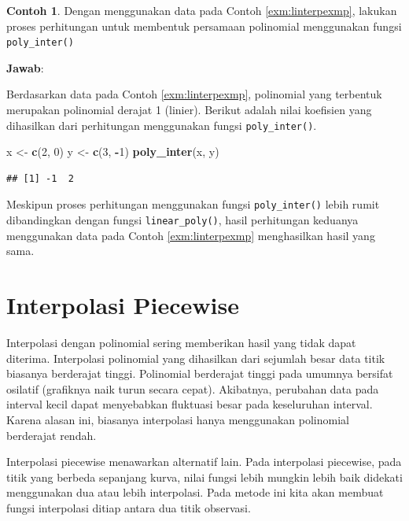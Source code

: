 \documentclass[
]{book}
\newenvironment{Shaded}{\begin{snugshade}}{\end{snugshade}}
\newcommand{\DecValTok}[1]{\textcolor[rgb]{0.00,0.00,0.81}{#1}}
\newcommand{\FunctionTok}[1]{\textcolor[rgb]{0.13,0.29,0.53}{\textbf{#1}}}
\newcommand{\NormalTok}[1]{#1}
\newcommand{\OtherTok}[1]{\textcolor[rgb]{0.56,0.35,0.01}{#1}}
\newcommand{\SpecialCharTok}[1]{\textcolor[rgb]{0.81,0.36,0.00}{\textbf{#1}}}
\theoremstyle{definition}
\theoremstyle{definition}
\newtheorem{example}{Contoh}[chapter]
\theoremstyle{definition}
\theoremstyle{definition}
\theoremstyle{remark}
\begin{document}
\begin{example}
\protect\hypertarget{exm:hopoliexmp2}{}\label{exm:hopoliexmp2}Dengan menggunakan data pada Contoh \ref{exm:linterpexmp}, lakukan proses perhitungan untuk membentuk persamaan polinomial menggunakan fungsi \texttt{poly\_inter()}
\end{example}

\textbf{Jawab}:

Berdasarkan data pada Contoh \ref{exm:linterpexmp}, polinomial yang terbentuk merupakan polinomial derajat 1 (linier). Berikut adalah nilai koefisien yang dihasilkan dari perhitungan menggunakan fungsi \texttt{poly\_inter()}.

\begin{Shaded}
\begin{Highlighting}[]
\NormalTok{x }\OtherTok{\textless{}{-}} \FunctionTok{c}\NormalTok{(}\DecValTok{2}\NormalTok{, }\DecValTok{0}\NormalTok{)}
\NormalTok{y }\OtherTok{\textless{}{-}} \FunctionTok{c}\NormalTok{(}\DecValTok{3}\NormalTok{, }\SpecialCharTok{{-}}\DecValTok{1}\NormalTok{)}
\FunctionTok{poly\_inter}\NormalTok{(x, y)}
\end{Highlighting}
\end{Shaded}

\begin{verbatim}
## [1] -1  2
\end{verbatim}

Meskipun proses perhitungan menggunakan fungsi \texttt{poly\_inter()} lebih rumit dibandingkan dengan fungsi \texttt{linear\_poly()}, hasil perhitungan keduanya menggunakan data pada Contoh \ref{exm:linterpexmp} menghasilkan hasil yang sama.

\hypertarget{pwinter}{%
\section{Interpolasi Piecewise}\label{pwinter}}

Interpolasi dengan polinomial sering memberikan hasil yang tidak dapat diterima. Interpolasi polinomial yang dihasilkan dari sejumlah besar data titik biasanya berderajat tinggi. Polinomial berderajat tinggi pada umumnya bersifat osilatif (grafiknya naik turun secara cepat). Akibatnya, perubahan data pada interval kecil dapat menyebabkan fluktuasi besar pada keseluruhan interval. Karena alasan ini, biasanya interpolasi hanya menggunakan polinomial berderajat rendah.

Interpolasi piecewise menawarkan alternatif lain. Pada interpolasi piecewise, pada titik yang berbeda sepanjang kurva, nilai fungsi lebih mungkin lebih baik didekati menggunakan dua atau lebih interpolasi. Pada metode ini kita akan membuat fungsi interpolasi ditiap antara dua titik observasi.
\end{document}
